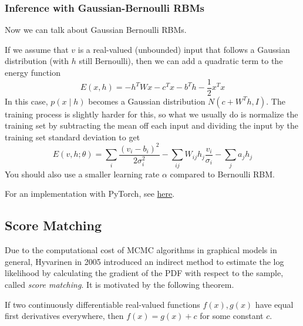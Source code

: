   \subsubsection{Inference with Gaussian-Bernoulli RBMs}

    Now we can talk about Gaussian Bernoulli RBMs. 

    \begin{definition} 
      If we assume that $v$ is a real-valued (unbounded) input that follows a Gaussian distribution (with $h$ still Bernoulli), then we can add a quadratic term to the energy function 
      \begin{equation} 
        E(x, h) = - h^T W x - c^T x - b^T h - \frac{1}{2} x^T x
      \end{equation}
      In this case, $p(x \mid h)$ becomes a Gaussian distribution $N(c + W^T h, I)$. The training process is slightly harder for this, so what we usually do is normalize the training set by subtracting the mean off each input and dividing the input by the training set standard deviation to get  
      \begin{equation} 
        E(v, h; \theta) = \sum_i \frac{(v_i - b_i)^2}{2 \sigma_i^2} - \sum_{ij} W_{ij} h_j \frac{v_i}{\sigma_i} - \sum_j a_j h_j
      \end{equation}
      You should also use a smaller learning rate $\alpha$ compared to Bernoulli RBM. 
    \end{definition} 

    \begin{algo}[Implementation]
      For an implementation with PyTorch, see \href{code/rbm.html}{here}. 
    \end{algo}

\subsection{Score Matching} 

    Due to the computational cost of MCMC algorithms in graphical models in general, Hyvarinen in 2005 introduced an indirect method to estimate the log likelihood by calculating the gradient of the PDF with respect to the sample, called \textit{score matching}. It is motivated by the following theorem. 

    \begin{theorem}
      If two continuously differentiable real-valued functions $f(x), g(x)$ have equal first derivatives everywhere, then $f(x) = g(x) + c$ for some constant $c$. 
    \end{theorem}

